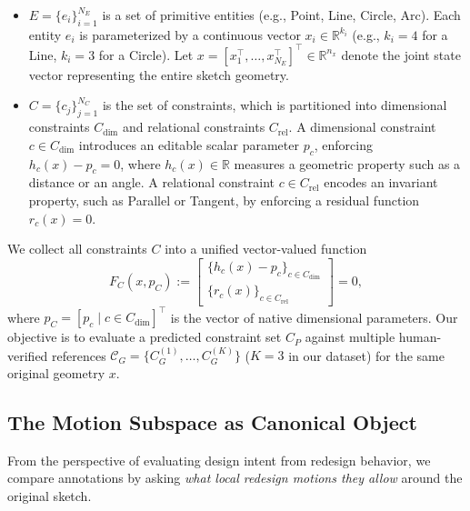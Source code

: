 \begin{itemize}[leftmargin=*, itemsep=2pt, topsep=2pt]
    \item $E = \{e_i\}_{i=1}^{N_E}$ is a set of primitive entities (e.g., Point, Line, Circle, Arc). Each entity $e_i$ is parameterized by a continuous vector $x_i \in \mathbb{R}^{k_i}$ (e.g., $k_i=4$ for a Line, $k_i=3$ for a Circle). Let $x = [x_1^\top,\dots,x_{N_E}^\top]^\top \in \mathbb{R}^{n_x}$ denote the joint state vector representing the entire sketch geometry.
    \item $C = \{c_j\}_{j=1}^{N_C}$ is the set of constraints, which is partitioned into dimensional constraints $C_\mathrm{dim}$ and relational constraints $C_\mathrm{rel}$. A dimensional constraint $c \in C_\mathrm{dim}$ introduces an editable scalar parameter $p_c$, enforcing $h_c(x) - p_c = 0$, where $h_c(x) \in \mathbb{R}$ measures a geometric property such as a distance or an angle. A relational constraint $c \in C_\mathrm{rel}$ encodes an invariant property, such as Parallel or Tangent, by enforcing a residual function $r_c(x) = 0$.
\end{itemize}

We collect all constraints $C$ into a unified vector-valued function
\begin{equation}
    F_C(x,p_C):=
    \begin{bmatrix}
        \{h_c(x)-p_c\}_{c\in C_{\mathrm{dim}}}\\
        \{r_c(x)\}_{c\in C_{\mathrm{rel}}}
    \end{bmatrix}
    =0,
\end{equation}
where $p_C=[p_c\mid c\in C_{\mathrm{dim}}]^\top$ is the vector of native
dimensional parameters. Our objective is to evaluate a predicted constraint set $C_P$ against multiple human-verified references $\mathcal{C}_G=\{C_G^{(1)},\dots,C_G^{(K)}\}$ ($K=3$ in our dataset) for the same original geometry $x$.


\subsection{The Motion Subspace as Canonical Object}
\label{sec:motion_subspace}

From the perspective of evaluating design intent from redesign behavior, we compare annotations by asking \textit{what local redesign motions they allow} around the original sketch.

